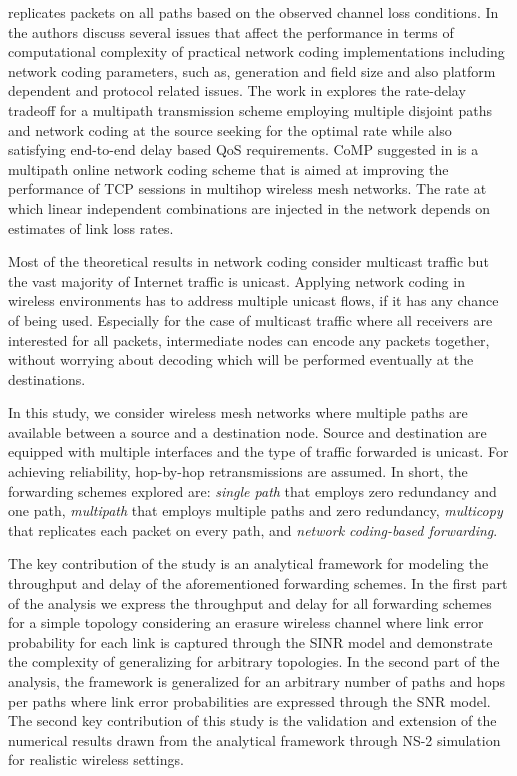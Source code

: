 \documentclass[journal, onecolumn, 12pt]{IEEEtran}
\begin{document}
replicates packets on all paths based on the observed channel loss conditions.
In \cite{netcod_des:2013} the authors discuss several issues that affect the performance in terms of computational complexity of practical network coding implementations
including network coding parameters, such as, generation and field size and also platform dependent and protocol related issues.
The work in \cite{6134700} explores the rate-delay tradeoff for a multipath transmission scheme employing multiple disjoint paths and network coding at the source seeking for the optimal rate while also
satisfying end-to-end delay based QoS requirements.
CoMP suggested in \cite{5502204} is a multipath online network coding scheme that is aimed at improving the performance of TCP sessions in multihop wireless mesh networks.
The rate at which linear independent combinations are injected in the network depends on estimates of link loss rates.

Most of the theoretical results in network coding consider multicast traffic but the vast majority of Internet traffic is unicast.
Applying network coding in wireless environments has to address multiple unicast flows, if it has any chance of being used.
Especially for the case of multicast traffic where all receivers are interested for all packets, intermediate nodes can encode any packets together, without worrying about decoding which will be performed eventually at the destinations.

In this study, we consider wireless mesh networks where multiple paths are available between a source and a destination node.
Source and destination are equipped with multiple interfaces and the type of traffic forwarded is unicast.
For achieving reliability, hop-by-hop retransmissions are assumed.
In short, the forwarding schemes explored are: \textit{single path} that employs zero redundancy and one path, \textit{multipath} that employs multiple paths and zero redundancy, \textit{multicopy} that replicates each packet on every path, and \textit{network coding-based forwarding}.

The key contribution of the study is an analytical framework for modeling the throughput and delay of the aforementioned forwarding schemes.
In the first part of the analysis we express the throughput and delay for all forwarding schemes for a simple topology considering an erasure wireless channel where link error probability for each link
is captured through the SINR model and demonstrate the complexity of generalizing for arbitrary topologies.
In the second part of the analysis, the framework is generalized for an arbitrary number of paths and hops per paths where link error probabilities are expressed through the SNR model.
The second key contribution of this study is the validation and extension of the numerical results drawn from the analytical framework through NS-2 simulation for realistic wireless settings.
\end{document}
